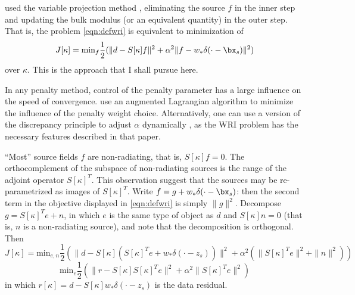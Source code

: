\cite{LeeuwenHerrmann:16} used
the variable projection method \cite[]{GolubPereyra:03}, eliminating the source $f$ in the
inner step and updating the bulk modulus (or an equivalent quantity)
in the outer step. That is, the problem \ref{eqn:defwri} is equivalent to minimization of
\begin{equation}
\label{eqn:defvpm}
  J[\kappa] =
  \mbox{min}_f \frac{1}{2}(\| d-S[\kappa]f\|^2+\alpha^2\|f-w_*\delta(\cdot-\bx_s)\|^2)
\end{equation}
over $\kappa$. This is the approach that I shall pursue here.

In any penalty method, control of the penalty
parameter has a large influence on the speed of
convergence. \cite{Aghamiry:19} use an augmented Lagrangian algorithm
to minimize the influence of the penalty weight choice. Alternatively, one can use a version of the discrepancy principle to adjust $\alpha$ dynamically \cite[]{FuSymes2017discrepancy}, as the WRI problem has the necessary features described in that paper.

``Most'' source fields $f$ are non-radiating,
that is, $S[\kappa]f=0$. The orthocomplement of the subspace of
non-radiating sources is the range of the adjoint operator
$S[\kappa]^T$. This observation suggest that the sources may be re-parametrized as images of
$S[\kappa]^T$. Write $f = g + w_*\delta(\cdot-\bx_s)$: then the second term in
the objective displayed in \ref{eqn:defwri} is simply $\|g\|^2$.
Decompose $g = S[\kappa]^Te + n$, in
which $e$ is the same type of object as $d$ and $S[\kappa]n=0$ (that
is, $n$ is a non-radiating
source), and note that the decomposition is orthogonal. Then
\[
  J[\kappa] =
  \mbox{min}_{e,n} \frac{1}{2}(\| d-S[\kappa](S[\kappa]^Te+w_*\delta(\cdot-z_s))\|^2+\alpha^2(\|S[\kappa]^Te\|^2+\|n\|^2))
  \]
\begin{equation}
  \label{eqn:defvpmred}
   \mbox{min}_{e} \frac{1}{2}(\|r-S[\kappa]S[\kappa]^Te\|^2+\alpha^2\|S[\kappa]^Te\|^2)
 \end{equation}
 in which $r[\kappa]=d-S[\kappa]w_*\delta(\cdot-z_s)$ is the data residual.
 
